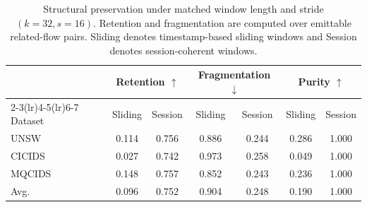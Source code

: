 \begin{table}[H]
\centering
\scriptsize
\caption{Structural preservation under matched window length and stride
$(k=32,s=16)$. Retention and fragmentation are computed over emittable
related-flow pairs. Sliding denotes timestamp-based sliding windows and
Session denotes session-coherent windows.}
\label{tab:session_temporalization}
\setlength{\tabcolsep}{2.0pt}
\begin{tabular}{lcccccc}
\toprule
& \multicolumn{2}{c}{Retention $\uparrow$} &
  \multicolumn{2}{c}{Fragmentation $\downarrow$} &
  \multicolumn{2}{c}{Purity $\uparrow$} \\
\cmidrule(lr){2-3}\cmidrule(lr){4-5}\cmidrule(lr){6-7}
Dataset & Sliding & Session & Sliding & Session & Sliding & Session \\
\midrule
UNSW   & 0.114 & 0.756 & 0.886 & 0.244 & 0.286 & 1.000 \\
CICIDS & 0.027 & 0.742 & 0.973 & 0.258 & 0.049 & 1.000 \\
MQCIDS & 0.148 & 0.757 & 0.852 & 0.243 & 0.236 & 1.000 \\
\midrule
Avg.   & 0.096 & 0.752 & 0.904 & 0.248 & 0.190 & 1.000 \\
\bottomrule
\end{tabular}
\vspace{-0.8em}
\end{table}
